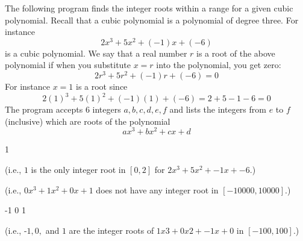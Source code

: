 The following program finds the integer roots within a range for a given cubic
polynomial. Recall that a cubic polynomial is a polynomial of degree three.
For instance
\[
	2x^3 + 5x^2 + (-1)x + (-6)
\]
is a cubic polynomial. We say that a real number $r$ is a root of the above
polynomial if when you substitute $x = r$ into the polynomial, you get zero:
\[
	 2r^3 + 5r^2 + (-1)r + (-6) = 0
\]
For instance $x = 1$ is a root since
\[
2(1)^3 + 5(1)^2 + (-1)(1) + (-6) = 2 + 5  - 1 - 6 = 0
\]
The program accepts $6$ integers $a, b, c, d, e, f$ and lists the integers
from $e$ to $f$ (inclusive) which are roots of the polynomial
\[
	ax^3 + bx^2 + cx + d
\]

\resett
\nextt
\begin{console}[commandchars=\\\{\}]
1
\end{console}
(i.e., $1$ is the only integer root in $[0, 2]$ for $2x^3 + 5x^2 + -1x + -6$.)


\nextt
\begin{console}[commandchars=\\\{\}]

\end{console}
(i.e., $0x^3 + 1x^2 + 0x + 1$ does not have any integer root in
$[-10000, 10000]$.)


\nextt
\begin{console}[commandchars=\\\{\}]
-1 0 1
\end{console}
(i.e., -$1, 0,$ and $1$ are the integer roots of $1x3 + 0x2 + -1x + 0$ in
$[-100, 100]$.)
